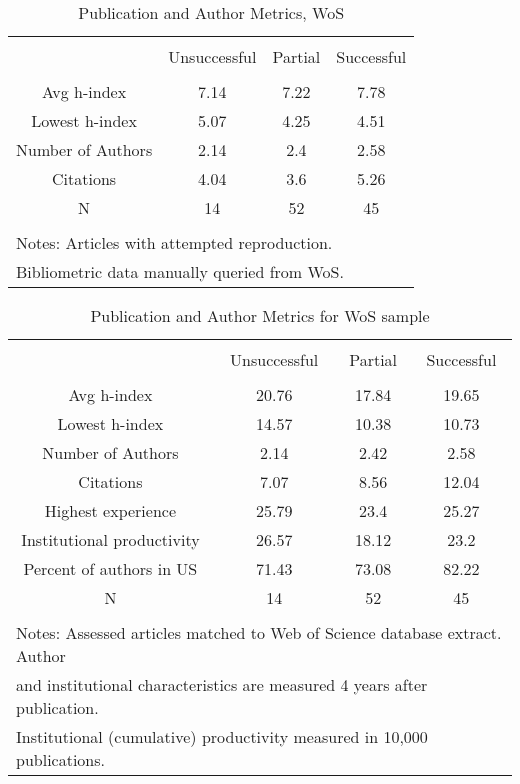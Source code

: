 \documentclass{cje_appendix} %
\theoremstyle{plain}%
\theoremstyle{definition}
\theoremstyle{remark}
\begin{document}
\begin{table} \centering 
  \caption{Publication and Author Metrics, WoS} 
  \label{tab:metrics} 
\begin{tabular}{@{\extracolsep{0.4pt}} cccc} 
\\[-1.8ex]\hline 
\hline \\[-1.8ex] 
  & Unsuccessful & Partial & Successful \\ 
\hline \\[-1.8ex] 
Avg h-index & 7.14 & 7.22 & 7.78 \\ 
Lowest h-index & 5.07 & 4.25 & 4.51 \\ 
Number of Authors & 2.14 & 2.4 & 2.58 \\ 
Citations & 4.04 & 3.6 & 5.26 \\ 
N & 14 & 52 & 45 \\ 
\hline \\[-1.8ex] 
\multicolumn{4}{l}{Notes: Articles with attempted reproduction.} \\ 
\multicolumn{4}{l}{Bibliometric data manually queried from WoS.} \\ 
\end{tabular} 
\end{table} 

\begin{table} \centering 
  \caption{Publication and Author Metrics for WoS sample} 
  \label{tab:metrics:OA:WoS} 
\begin{tabular}{@{\extracolsep{0.4pt}} cccc} 
\\[-1.8ex]\hline 
\hline \\[-1.8ex] 
  & Unsuccessful & Partial & Successful \\ 
\hline \\[-1.8ex] 
Avg h-index & 20.76 & 17.84 & 19.65 \\ 
Lowest h-index & 14.57 & 10.38 & 10.73 \\ 
Number of Authors & 2.14 & 2.42 & 2.58 \\ 
Citations & 7.07 & 8.56 & 12.04 \\ 
Highest experience & 25.79 & 23.4 & 25.27 \\ 
Institutional productivity & 26.57 & 18.12 & 23.2 \\ 
Percent of authors in US & 71.43 & 73.08 & 82.22 \\ 
N & 14 & 52 & 45 \\ 
\hline \\[-1.8ex] 
\multicolumn{4}{l}{Notes: Assessed articles matched to Web of Science database extract. Author } \\ 
\multicolumn{4}{l}{and institutional characteristics are measured 4 years after publication.} \\ 
\multicolumn{4}{l}{Institutional (cumulative) productivity measured in 10,000 publications.} \\ 
\end{tabular} 
\end{table} 
\end{document}
